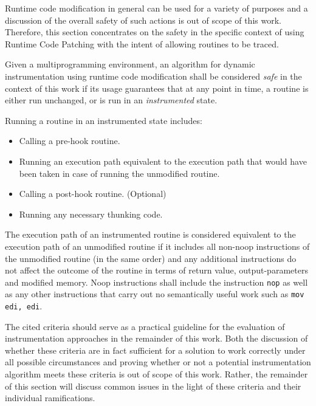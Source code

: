 Runtime code modification in general can be used for a variety of purposes and a discussion 
of the overall safety of such actions is out of scope of this work. Therefore,
this section concentrates on the safety in the specific context of using
Runtime Code Patching with the intent of allowing routines to be traced.

Given a multiprogramming environment, an algorithm for dynamic instrumentation using 
runtime code modification shall be considered \emph{safe} in the context of this work if 
its usage guarantees that at any point in time, a routine is either run unchanged, 
or is run in an \emph{instrumented} state. 




Running a routine in an instrumented state includes:
\begin{itemize}
	\item Calling a pre-hook routine.
	\item Running an execution path equivalent to the execution path 
		that would have been taken in case of running the unmodified routine.
	\item Calling a post-hook routine. (Optional)
	\item Running any necessary thunking code. 
\end{itemize}

The execution path of an instrumented routine is considered equivalent to the execution
path of an unmodified routine if it includes all non-noop instructions of the unmodified
routine (in the same order) and any additional instructions do not affect the
outcome of the routine in terms of return value, output-parameters and modified memory.
Noop instructions shall include the instruction \verb|nop| as well as any other instructions
that carry out no semantically useful work such as \verb|mov edi, edi|.

The cited criteria should serve as a practical guideline for the evaluation of instrumentation
approaches in the remainder of this work. Both the discussion of whether these criteria are in fact
sufficient for a solution to work correctly under all possible circumstances
and proving whether or not a potential instrumentation algorithm meets these criteria is out of scope
of this work. Rather, the remainder of this section will discuss common issues in
the light of these criteria and their individual ramifications. 

